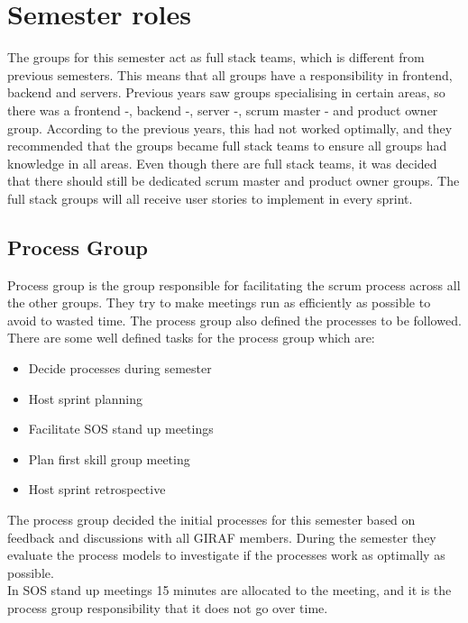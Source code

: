 \section{Semester roles}
The groups for this semester act as full stack teams, which is different from previous semesters. 
This means that all groups have a responsibility in frontend, backend and servers.
Previous years saw groups specialising in certain areas, so there was a frontend -, backend -, server -, scrum master - and product owner group. 
According to the previous years, this had not worked optimally, and they recommended that the groups became full stack teams to ensure all groups had knowledge in all areas.
Even though there are full stack teams, it was decided that there should still be dedicated scrum master and product owner groups. 
The full stack groups will all receive user stories to implement in every sprint.

\subsection{Process Group}
Process group is the group responsible for facilitating the scrum process across all the other groups.
They try to make meetings run as efficiently as possible to avoid to wasted time.
The process group also defined the processes to be followed.
\\
There are some well defined tasks for the process group which are:
\begin{itemize}
    \item Decide processes during semester
    \item Host sprint planning
    \item Facilitate SOS stand up meetings
    \item Plan first skill group meeting
    \item Host sprint retrospective
\end{itemize}
\noindent
The process group decided the initial processes for this semester based on feedback and discussions with all GIRAF members.
During the semester they evaluate the process models to investigate if the processes work as optimally as possible.
\\
In SOS stand up meetings 15 minutes are allocated to the meeting, and it is the process group responsibility that it does not go over time.

